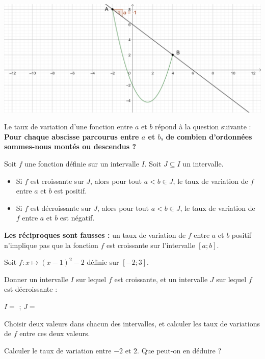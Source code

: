 \documentclass{article}
\begin{document}
\begin{center}
\includegraphics[width=\textwidth]{Taux_variation_pente.png}
\end{center}
\begin{remark}
Le taux de variation d'une fonction entre $a$ et $b$ répond à la question suivante : \textbf{Pour chaque abscisse parcourus entre $a$ et $b$, de combien d'ordonnées sommes-nous montés ou descendus ?}
\end{remark}
\begin{tcolorbox}
\begin{proposition}
Soit $f$ une fonction définie sur un intervalle $I$. Soit $J \subseteq I$ un intervalle.
\begin{itemize}
\item Si $f$ est croissante sur $J$, alors pour tout $a < b \in J$, le taux de variation de $f$ entre $a$ et $b$ est positif.  
\item Si $f$ est décroissante sur $J$, alors pour tout $a < b \in J$, le taux de variation de $f$ entre $a$ et $b$ est négatif.  
\end{itemize}
\end{proposition}
\end{tcolorbox}
\begin{remark}
\textbf{Les réciproques sont fausses :} un taux de variation de $f$ entre $a$ et $b$ positif n'implique pas que la fonction $f$ est croissante sur l'intervalle $[a;b]$.
\end{remark}
\begin{example}
Soit $f \colon x \mapsto (x-1)^2 - 2$ définie sur $[-2;3]$.
\begin{enumquestions}
\item Donner un intervalle $I$ sur lequel $f$ est croissante, et un intervalle $J$ sur lequel $f$ est décroissante : 

$I =$ \answersline; $J = $ \answersline
\item Choisir deux valeurs dans chacun des intervalles, et calculer les taux de variations de $f$ entre ces deux valeurs.

\answersline
\item Calculer le taux de variation entre $-2$ et $2$. Que peut-on en déduire ? \answersline
\end{enumquestions} 
\end{example}
\newpage
\end{document}
